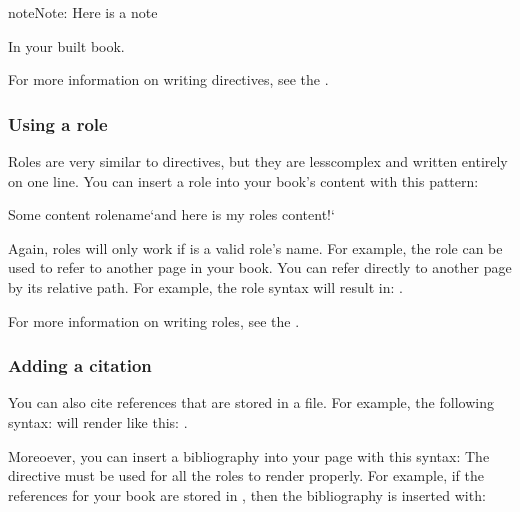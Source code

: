 \documentclass[letterpaper,10pt,english]{jupyterBook}
\begin{document}
\begin{sphinxadmonition}{note}{Note:}
\sphinxAtStartPar
Here is a note
\end{sphinxadmonition}

\sphinxAtStartPar
In your built book.

\sphinxAtStartPar
For more information on writing directives, see the
.


\subsubsection{Using a role}
\label{\detokenize{markdown:using-a-role}}
\sphinxAtStartPar
Roles are very similar to directives, but they are less\sphinxhyphen{}complex and written
entirely on one line. You can insert a role into your book’s content with
this pattern:

\begin{sphinxVerbatim}[commandchars=\\\{\}]
Some content \PYGZob{}rolename\PYGZcb{}`and here is my role\PYGZsq{}s content!`
\end{sphinxVerbatim}

\sphinxAtStartPar
Again, roles will only work if  is a valid role’s name. For example,
the  role can be used to refer to another page in your book. You can
refer directly to another page by its relative path. For example, the
role syntax  will result in: {\hyperref[\detokenize{introductie::doc}]{}}.

\sphinxAtStartPar
For more information on writing roles, see the
.


\subsubsection{Adding a citation}
\label{\detokenize{markdown:adding-a-citation}}
\sphinxAtStartPar
You can also cite references that are stored in a  file. For example,
the following syntax:  will render like
this: .

\sphinxAtStartPar
Moreoever, you can insert a bibliography into your page with this syntax:
The  directive must be used for all the  roles to
render properly.
For example, if the references for your book are stored in ,
then the bibliography is inserted with:
\end{document}
